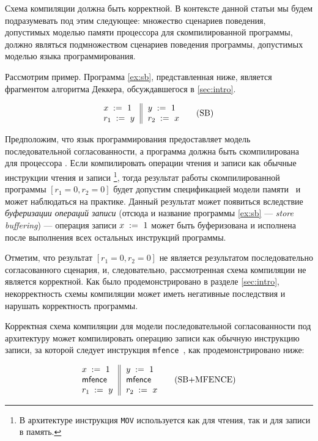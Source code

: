 Схема компиляции должна быть корректной. 
В контексте данной статьи мы будем подразумевать под 
этим следующее: множество сценариев поведения, допустимых
моделью памяти процессора для скомпилированной программы, 
должно являться подмножеством сценариев поведения программы, допустимых 
моделью языка программирования. 

Рассмотрим пример. 
Программа \ref{ex:sb}, представленная ниже, является 
фрагментом алгоритма Деккера, обсуждавшегося  в   \cref{sec:intro}.

\begin{equation*}
\inarrII{
   \writeInst{}{x}{1}   \\
   \readInst{}{r_1}{y}  \\
}{
  \writeInst{}{y}{1}   \\
  \readInst{}{r_2}{x}  \\
}
\tag{SB}\label{ex:sb}
\end{equation*}

Предположим, что язык программирования предоставляет 
модель последовательной согласованности, а программа
должна быть скомпилирована для процессора \Intel. 
Если компилировать операции чтения и записи 
как обычные инструкции чтения и записи \Intel \footnote{
В архитектуре \Intel инструкция \texttt{MOV} 
используется как для чтения, так и для записи в память.},
тогда результат работы скомпилированной программы
${[r_1=0, r_2=0]}$ будет допустим спецификацией модели памяти~\Intel
и может наблюдаться на практике. 
Данный результат может появиться вследствие 
\emph{буферизации операций записи}
(отсюда и название программы \ref{ex:sb} --- \emph{store buffering}) ---  
операция записи ${x\;:=_{}\;1}$ может быть буферизована 
и исполнена после выполнения всех остальных инструкций программы. 

Отметим, что результат ${[r_1=0, r_2=0]}$ не является результатом последовательно согласованного сценария,
и, следовательно, рассмотренная схема компиляции не является корректной. 
Как было продемонстрировано в разделе \cref{sec:intro}, 
некорректность схемы компиляции может иметь 
негативные последствия и нарушать корректность программы. 

Корректная схема компиляции для модели последовательной согласованности 
под архитектуру \Intel может компилировать 
операцию записи как обычную инструкцию записи, за которой следует 
инструкция \texttt{mfence}~\cite{Sewell-al:CACM10, Batty-al:POPL11}, 
как продемонстрировано ниже:

\begin{equation*}
\inarrII{
   \writeInst{}{x}{1}   \\
   \mfenceInst          \\
   \readInst{}{r_1}{y}  \\
}{
  \writeInst{}{y}{1}   \\
  \mfenceInst          \\
  \readInst{}{r_2}{x}  \\
}
\tag{SB+MFENCE}\label{ex:sb-mfence}
\end{equation*}

